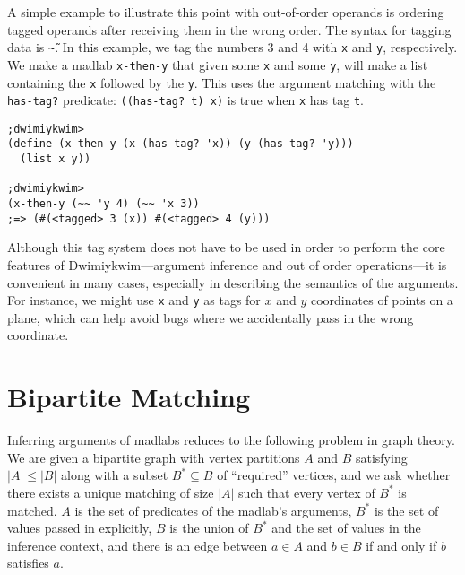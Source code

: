 \documentclass[11pt]{article}
\begin{document}
A simple example to illustrate this point with out-of-order operands
is ordering tagged operands after receiving them in the wrong order.
The syntax for tagging data is \texttt{\~\~}.
In this example, we tag the numbers 3 and 4 with \texttt{x} and \texttt{y},
respectively.
We make a madlab \texttt{x-then-y} that
given some \texttt{x} and some \texttt{y},
will make a list containing the \texttt{x} followed by the \texttt{y}.
This uses the argument matching with the \texttt{has-tag?} predicate:
\texttt{((has-tag? t) x)} is true when \texttt{x} has tag \texttt{t}.

\begin{Verbatim}
;dwimiykwim>
(define (x-then-y (x (has-tag? 'x)) (y (has-tag? 'y)))
  (list x y))

;dwimiykwim>
(x-then-y (~~ 'y 4) (~~ 'x 3))
;=> (#(<tagged> 3 (x)) #(<tagged> 4 (y)))
\end{Verbatim}

Although this tag system does not have to be used in order to perform
the core features of Dwimiykwim---argument inference
and out of order operations---it is convenient
in many cases, especially in describing the semantics of the arguments.
For instance, we might use \texttt{x} and \texttt{y} as tags for
$x$ and $y$ coordinates of points on a plane,
which can help avoid bugs where we accidentally pass in the wrong coordinate.


\section{Bipartite Matching}\label{bipartite}

Inferring arguments of madlabs
reduces to the following problem in graph theory.
We are given a bipartite graph with vertex partitions $A$ and $B$
satisfying $|A| \leq |B|$
along with a subset $B^* \subseteq B$ of ``required'' vertices,
and we ask whether there exists a unique matching of size $|A|$
such that every vertex of $B^*$ is matched.
$A$ is the set of predicates of the madlab's arguments,
$B^*$ is the set of values passed in explicitly,
$B$ is the union of $B^*$ and the set of values in the inference context,
and there is an edge between $a \in A$ and $b \in B$
if and only if $b$ satisfies $a$.
\end{document}

